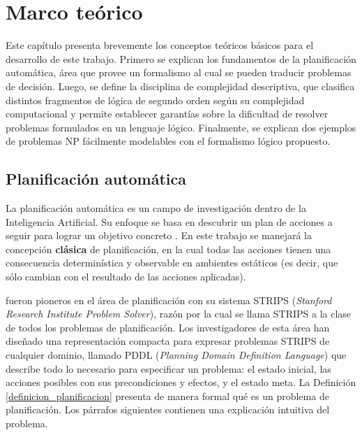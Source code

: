 
\chapter{Marco teórico}
\label{Chapter1}

Este capítulo presenta brevemente los conceptos teóricos básicos para el
desarrollo de este trabajo. Primero se explican los fundamentos de la
planificación automática, área que provee un formalismo al cual se pueden
traducir problemas de decisión. Luego, se define la disciplina de complejidad
descriptiva, que clasifica distintos fragmentos de lógica de segundo orden
según su complejidad computacional y permite establecer garantías sobre la
dificultad de resolver problemas formulados en un lenguaje lógico.
Finalmente, se explican dos ejemplos de problemas NP fácilmente modelables
con el formalismo lógico propuesto.


\section{Planificación automática}
La planificación automática es un campo de investigación dentro de la Inteligencia
Artificial. Su enfoque se basa en descubrir un plan de acciones a seguir para
lograr un objetivo concreto \citep{russell:book}. En este trabajo se manejará
la concepción \textbf{clásica} de planificación, en la cual todas las acciones
tienen una consecuencia determinística y observable en ambientes estáticos (es
decir, que sólo cambian con el resultado de las acciones aplicadas).

\cite{fikes:strips} fueron pioneros en el área de planificación con su sistema
STRIPS (\textit{Stanford Research
Institute Problem Solver}), razón por la cual se llama STRIPS a la clase de
todos los problemas de planificación.
Los investigadores de esta área han diseñado una representación compacta para
expresar problemas STRIPS de cualquier dominio, llamado PDDL
(\textit{Planning Domain Definition Language}) que describe todo lo necesario
para especificar un problema: el estado inicial, las acciones posibles con sus
precondiciones y efectos, y el estado meta. 
La Definición \ref{definicion_planificacion} presenta de manera formal qué es
un problema de planificación. Los párrafos siguientes contienen una explicación
intuitiva del problema.

